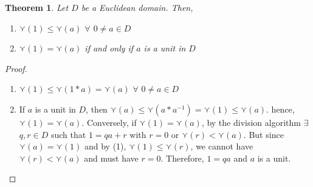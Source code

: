\documentclass[11pt]{article}
\newtheorem{thm}{Theorem}[section]
\theoremstyle{definition}
\numberwithin{equation}{section}
\begin{document}
\begin{thm}
Let $D$ be a Euclidean domain. Then,
\begin{enumerate}
    \item $\curlyvee(1) \leq \curlyvee(a)$ $\forall$ $0 \neq a \in D$
    \item $\curlyvee(1) = \curlyvee(a)$ if and only if $a$ is a unit in $D$
\end{enumerate}
\end{thm}

\begin{proof}
\begin{enumerate}
    \item $\curlyvee(1) \leq \curlyvee(1*a)=\curlyvee(a)$ $\forall$ $0 \neq a \in D$
    \item If $a$ is a unit in $D$, then $\curlyvee(a) \leq \curlyvee(a*a^{-1}) = \curlyvee(1) \leq \curlyvee(a)$. hence, $\curlyvee(1) = \curlyvee(a)$. Conversely, if $\curlyvee(1) = \curlyvee(a)$, by the division algorithm $\exists$ $q, r \in D$ such that $1 = qa+r$ with $r = 0$ or $\curlyvee(r) < \curlyvee(a)$. But since $\curlyvee(a) = \curlyvee(1)$ and by (1), $\curlyvee(1) \leq \curlyvee(r)$, we cannot have $\curlyvee(r) < \curlyvee(a)$ and must have $r = 0$. Therefore, $1 = qa$ and $a$ is a unit.
\end{enumerate}
\end{proof}
\end{document}
